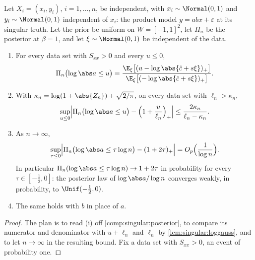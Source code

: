 \begin{refsection}
\begin{theorem}\label{thm:singular:scales}
Let $X_i=(x_i,y_i)$, $i=1,\dots,n$, be independent, with $x_i\sim\Normal(0,1)$ and $y_i\sim\Normal(0,1)$ independent of $x_i$: the product model $y=abx+\varepsilon$ at its singular truth. Let the prior be uniform on $W=[-1,1]^2$, let $\Pi_n$ be the posterior at $\beta=1$, and let $\xi\sim\Normal(0,1)$ be independent of the data.
\begin{enumerate}[label=(\roman*)]
\item For every data set with $S_{xx}>0$ and every $u\le0$,
\begin{equation}\label{eq:singular:cdf}
\Pi_n\bigl(\log\abs a\le u\bigr)=\frac{\E_\xi\bigl[(u-\log\abs{\hat c+s\xi})_+\bigr]}{\E_\xi\bigl[(-\log\abs{\hat c+s\xi})_+\bigr]}.
\end{equation}
\item With $\kappa_n=\log(1+\abs{Z_n})+\sqrt{2/\pi}$, on every data set with $\ell_n>\kappa_n$,
\begin{equation}\label{eq:singular:bound}
\sup_{u\le0}\Bigl|\Pi_n\bigl(\log\abs a\le u\bigr)-\Bigl(1+\frac u{\ell_n}\Bigr)_+\Bigr|\le\frac{2\kappa_n}{\ell_n-\kappa_n}.
\end{equation}
\item As $n\to\infty$,
\[
\sup_{\tau\le0}\Bigl|\Pi_n\bigl(\log\abs a\le\tau\log n\bigr)-(1+2\tau)_+\Bigr|=O_p\Bigl(\frac1{\log n}\Bigr).
\]
In particular $\Pi_n(\log\abs a\le\tau\log n)\to1+2\tau$ in probability for every $\tau\in[-\frac12,0]$: the posterior law of $\log\abs a/\log n$ converges weakly, in probability, to $\Unif(-\frac12,0)$.
\item The same holds with $b$ in place of $a$.
\end{enumerate}
\end{theorem}

\begin{proof}
The plan is to read (i) off \cref{comp:singular:posterior}, to compare its numerator and denominator with $u+\ell_n$ and $\ell_n$ by \cref{lem:singular:loggauss}, and to let $n\to\infty$ in the resulting bound. Fix a data set with $S_{xx}>0$, an event of probability one.


\end{proof}
\end{refsection}
